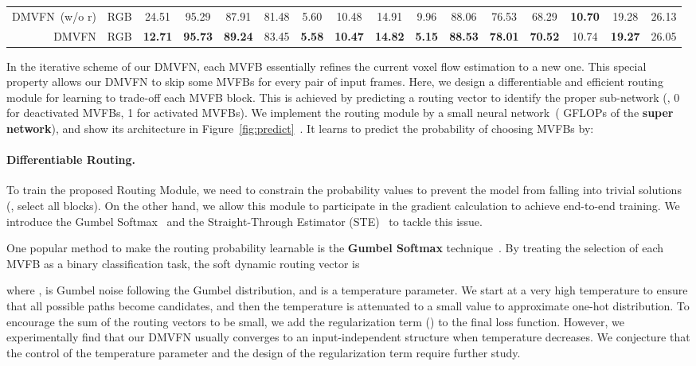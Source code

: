 \documentclass[10pt,twocolumn,letterpaper]{article}
\begin{document}
\begin{table*}[th]
{\begin{tabular}{rccccccccccccccc}
DMVFN~(w/o r)  & RGB &  24.51  & 95.29 & 87.91 & 81.48 & 5.60 & 10.48 & 14.91 & 9.96 &88.06 & 76.53 & 68.29 & \textbf{10.70} & 19.28 & 26.13 \\
DMVFN  & RGB & \textbf{12.71} & \textbf{95.73} & \textbf{89.24}& 83.45 & \textbf{5.58} & \textbf{10.47}& \textbf{14.82} & \textbf{5.15} & \textbf{88.53} & \textbf{78.01} & \textbf{70.52} & 10.74 & \textbf{19.27} & 26.05    \\

\midrule
\end{tabular}
}
\end{table*}

In the iterative scheme of our DMVFN, each MVFB essentially refines the current voxel flow estimation to a new one. This special property allows our DMVFN to skip some MVFBs for every pair of input frames. Here, we design a differentiable and efficient routing module for learning to trade-off each MVFB block. This is achieved by predicting a routing vector  to identify the proper sub-network (\eg, 0 for deactivated MVFBs, 1 for activated MVFBs). We implement the routing module by a small neural network~( GFLOPs of the \textbf{super network}), and show its architecture in Figure~\ref{fig:predict}~. It learns to predict the probability  of choosing MVFBs by:



\paragraph{Differentiable Routing.} To train the proposed Routing Module, we need to constrain the probability values to prevent the model from falling into trivial solutions (\eg, select all blocks). On the other hand, we allow this module to participate in the gradient calculation to achieve end-to-end training. We introduce the Gumbel Softmax~\cite{gumbel} and the Straight-Through Estimator (STE)~\cite{bengio2013estimating} to tackle this issue.

One popular method to make the routing probability  learnable is the \textbf{Gumbel Softmax} technique~\cite{gumbel,channel}. By treating the selection of each MVFB as a binary classification task, the soft dynamic routing vector  is

where ,  is Gumbel noise following the Gumbel distribution, and  is a temperature parameter. We start at a very high temperature to ensure that all possible paths become candidates, and then the temperature is attenuated to a small value to approximate one-hot distribution. To encourage the sum of the routing vectors  to be small, we add the regularization term () to the final loss function. However, we experimentally find that our DMVFN usually converges to an input-independent structure when temperature decreases. We conjecture that the control of the temperature parameter  and the design of the regularization term require further study.
\end{document}

